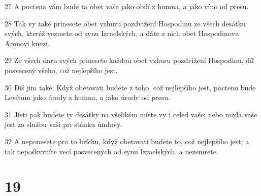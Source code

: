 \par 27 A poctena vám bude ta obet vaše jako obilí z humna, a jako víno od presu.
\par 28 Tak vy také prinesete obet vzhuru pozdvižení Hospodinu ze všech desátku svých, kteréž vezmete od synu Izraelských, a dáte z nich obet Hospodinovu Aronovi knezi.
\par 29 Ze všech daru svých prinesete každou obet vzhuru pozdvižení Hospodinu, díl posvecený všeho, což nejlepšího jest.
\par 30 Díš jim také: Když obetovati budete z toho, což nejlepšího jest, pocteno bude Levítum jako úrody z humna, a jako úrody od presu.
\par 31 Jísti pak budete ty desátky na všelikém míste vy i celed vaše; nebo mzda vaše jest za službu vaši pri stánku úmluvy.
\par 32 A neponesete pro to hríchu, když obetovati budete to, což nejlepšího jest; a tak nepoškvrníte vecí posvecených od synu Izraelských, a nezemrete.

\chapter{19}

